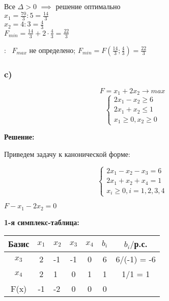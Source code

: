 \begin{flushleft}
    Все $\Delta > 0$ $\implies$ решение оптимально\\
    $x_1 = \frac{70}{3} : 5 = \frac{14}{3}$\\
    $x_2 = 4 : 3 = \frac{4}{3}$\\
    $F_{min} = \frac{14}{3} + 2 \cdot \frac{4}{3} = \frac{22}{3}$ 
\end{flushleft}

{:~} $F_{max}$ не определено; $F_{min} = F(\frac{14}{3}; \frac{4}{3}) = \frac{22}{3}$


\subsubsection{c)}
\begin{equation*}
    F = x_1 + 2x_2 \rightarrow max
\end{equation*}
\begin{equation*}
    \begin{cases}
        2x_1 - x_2 \ge 6 \\
        2x_1 + x_2 \le 1 \\
        x_1 \ge 0, x_2 \ge 0
    \end{cases}
\end{equation*}

\begin{center}
    {\bf
    Решение:}
\end{center}

\begin{flushleft}
Приведем задачу к канонической форме:
\end{flushleft}

\begin{equation*}
    \begin{cases}
        2x_1 - x_2 - x_3 = 6 \\
        2x_1 + x_2 + x_4 = 1 \\
        x_i \ge 0, i = 1, 2, 3, 4
    \end{cases}
\end{equation*}
\begin{center}
    $F - x_1 - 2x_2 = 0$
\end{center}

\begin{flushleft}
    {\bf1-я симплекс-таблица:}\\
\end{flushleft}

\begin{center}
    \begin{tabular}{|c | c g c c c c|} 
         \hline
            Базис & $x_1$ & $x_2$ & $x_3$ & $x_4$ & $b_i$ & $b_i/$р.с.\\
         \hline
            $x_3$ & 2 & -1 & -1 & 0 & 6 & 6/(-1) = -6\\
         \hline
            $x_4$ & 2 & 1 & 0 & 1 & 1 & 1/1 = 1\\
         \hline
            F(x) & -1 & -2 & 0 & 0 & 0 &\\
         \hline
    \end{tabular}
\end{center}


